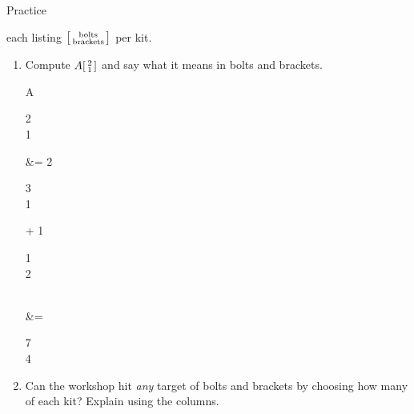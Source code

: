 \documentclass[10pt]{article}
\begin{document}
\begin{notesbox}{Practice}
\begin{enumerate}[leftmargin=1.9em, itemsep=10pt]
        each listing $\begin{bsmallmatrix} \text{bolts} \\ \text{brackets} \end{bsmallmatrix}$ per kit.
    \begin{enumerate}[label=(\alph*), leftmargin=1.8em, itemsep=5pt]
      \item Compute $A\begin{bsmallmatrix} 2 \\ 1 \end{bsmallmatrix}$ and say what it means in
            bolts and brackets.
\begin{work}
  A\begin{bsmallmatrix} 2\\1 \end{bsmallmatrix}
      &= 2\begin{bsmallmatrix} 3\\1 \end{bsmallmatrix} + 1\begin{bsmallmatrix} 1\\2 \end{bsmallmatrix} \\
      &= \begin{bsmallmatrix} 7\\4 \end{bsmallmatrix}
\end{work}
      \item Can the workshop hit \emph{any} target of bolts and brackets by choosing how many of
            each kit? Explain using the columns. 
    \end{enumerate}
\end{enumerate}
\end{notesbox}
\end{document}
